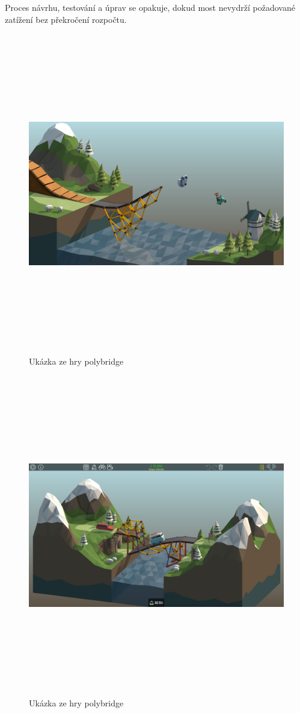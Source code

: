 Proces návrhu, testování a úprav se opakuje, dokud most nevydrží požadované zatížení bez překročení rozpočtu.


\begin{figure}[p]\centering
\includegraphics[width=140mm, height=140mm]{img/poly_screen_1.jpg}
\caption{Ukázka ze hry polybridge}
\label{fig:5}

\end{figure}

\begin{figure}[p]\centering
\includegraphics[width=140mm, height=140mm]{img/poly_screen_2.jpg}
\caption{Ukázka ze hry polybridge}
\label{fig:6}
\end{figure}



